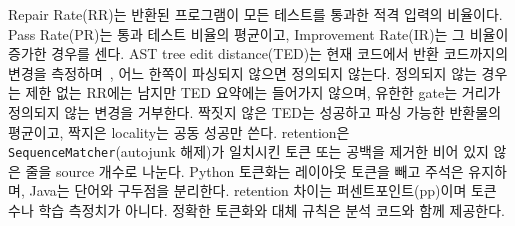 \documentclass[10pt,conference]{IEEEtran}
\begin{document}
Repair Rate(RR)는 반환된 프로그램이 모든 테스트를 통과한 적격 입력의 비율이다. Pass Rate(PR)는 통과 테스트 비율의 평균이고, Improvement Rate(IR)는 그 비율이 증가한 경우를 센다. AST tree edit distance(TED)는 현재 코드에서 반환 코드까지의 변경을 측정하며~\cite{zhang1989simple,pawlik2016tree}, 어느 한쪽이 파싱되지 않으면 정의되지 않는다. 정의되지 않는 경우는 제한 없는 RR에는 남지만 TED 요약에는 들어가지 않으며, 유한한 gate는 거리가 정의되지 않는 변경을 거부한다. 짝짓지 않은 TED는 성공하고 파싱 가능한 반환물의 평균이고, 짝지은 locality는 공동 성공만 쓴다. retention은 \texttt{SequenceMatcher}(autojunk 해제)가 일치시킨 토큰 또는 공백을 제거한 비어 있지 않은 줄을 source 개수로 나눈다. Python 토큰화는 레이아웃 토큰을 빼고 주석은 유지하며, Java는 단어와 구두점을 분리한다. retention 차이는 퍼센트포인트(pp)이며 토큰 수나 학습 측정치가 아니다. 정확한 토큰화와 대체 규칙은 분석 코드와 함께 제공한다.
\end{document}
